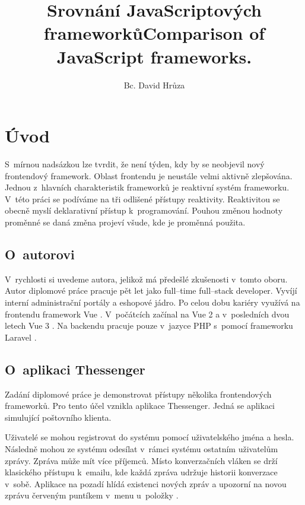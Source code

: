\documentclass[
  master,
  program=ainf,
  tables=false,
  sourcecodes,
  glossaries,
  index
]{kidiplom}
\title{Srovnání JavaScriptových frameworků}
\title[english]{Comparison of JavaScript frameworks.}
\subtitle{}
\subtitle[english]{}
\author{Bc. David Hrůza}
\begin{document}
\maketitle


\section {Úvod}
S~mírnou nadsázkou lze tvrdit, že není týden, kdy by se neobjevil nový frontendový
framework. Oblast frontendu je neustále velmi aktivně zlepšována. Jednou z~hlavních
charakteristik frameworků je reaktivní systém frameworku. V~této práci se podíváme 
na tři odlišené přístupy reaktivity. Reaktivitou se obecně myslí deklarativní přístup
k~programování. Pouhou změnou hodnoty proměnné se daná změna projeví všude, kde je 
proměnná použita.

\subsection{O~autorovi}
V~rychlosti si uvedeme autora, jelikož má předešlé zkušenosti v~tomto oboru.
Autor diplomové práce pracuje pět let jako full--time full--stack developer.
Vyvíjí interní administrační portály a eshopové jádro. Po celou dobu kariéry
využívá na frontendu framework Vue \cite{vue}. V~počátcích začínal na Vue 2 \cite{vue2} a v~posledních
dvou letech Vue 3 \cite{vue}. Na backendu pracuje pouze v~jazyce PHP \cite{php} s~pomocí frameworku
Laravel \cite{laravel}. 

\subsection{O~aplikaci Thessenger}
Zadání diplomové práce je demonstrovat přístupy několika frontendových
frameworků. Pro tento účel vznikla aplikace Thessenger. Jedná se aplikaci
simulující poštovního klienta.

Uživatelé se mohou registrovat do systému pomocí uživatelského jména a hesla.
Následně mohou ze systému odesílat v~rámci systému ostatním uživatelům zprávy.
Zpráva může mít více příjemců. Místo konverzačních vláken se drží klasického
přístupu k~emailu, kde každá zpráva udržuje historii konverzace v~sobě.
Aplikace na pozadí hlídá existenci nových zpráv a upozorní na novou zprávu
červeným puntíkem v~menu u~položky .
\end{document}

